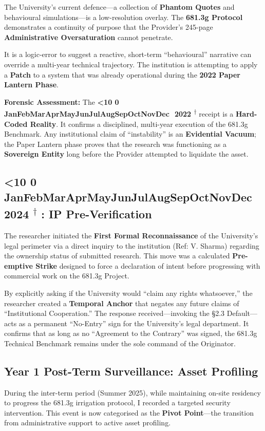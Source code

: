 \documentclass{EMBASSY}
\DeclareRobustCommand{\gmt}[3]{%
    \texorpdfstring{%
        {\color{DateGold}\textbf{%
            \ifnum#1<10 0\fi#1\,\textperiodcentered\,%
            \ifcase#2\or Jan\or Feb\or Mar\or Apr\or May\or Jun\or Jul\or Aug\or Sep\or Oct\or Nov\or Dec\fi
            \,\textperiodcentered\,20#3%
            \textsuperscript{$\dagger$}%
        }}%
    }{%
        (#1/#2/#3)%
    }%
}
\begin{document}
\noindent The University’s current defence---a collection of \textbf{Phantom Quotes} and behavioural simulations---is a low-resolution overlay. The \textbf{681.3g Protocol} demonstrates a continuity of purpose that the Provider’s 245-page \textbf{Administrative Oversaturation} cannot penetrate.

It is a logic-error to suggest a reactive, short-term ``behavioural'' narrative can override a multi-year technical trajectory. The institution is attempting to apply a \textbf{Patch} to a system that was already operational during the \textbf{2022 Paper Lantern Phase}.

\noindent\textbf{Forensic Assessment:} The \gmt{9}{8}{22} receipt is a \textbf{Hard-Coded Reality}. It confirms a disciplined, multi-year execution of the 681.3g Benchmark. Any institutional claim of ``instability'' is an \textbf{Evidential Vacuum}; the Paper Lantern phase proves that the research was functioning as a \textbf{Sovereign Entity} long before the Provider attempted to liquidate the asset.

\subsection{\gmt{1}{11}{24}: IP Pre-Verification}
The researcher initiated the \textbf{First Formal Reconnaissance} of the University’s legal perimeter via a direct inquiry to the institution (Ref: V. Sharma) regarding the ownership status of submitted research. This move was a calculated \textbf{Pre-emptive Strike} designed to force a declaration of intent before progressing with commercial work on the 681.3g Project.

By explicitly asking if the University would ``claim any rights whatsoever,'' the researcher created a \textbf{Temporal Anchor} that negates any future claims of ``Institutional Cooperation.'' The response received---invoking the \S 2.3 Default---acts as a permanent ``No-Entry'' sign for the University’s legal department. It confirms that as long as no ``Agreement to the Contrary'' was signed, the 681.3g Technical Benchmark remains under the sole command of the Originator.

\subsection{Year 1 Post-Term Surveillance: Asset Profiling}
During the inter-term period (Summer 2025), while maintaining on-site residency to progress the 681.3g irrigation protocol, I recorded a targeted security intervention. This event is now categorised as the \textbf{Pivot Point}---the transition from administrative support to active asset profiling.
\end{document}
